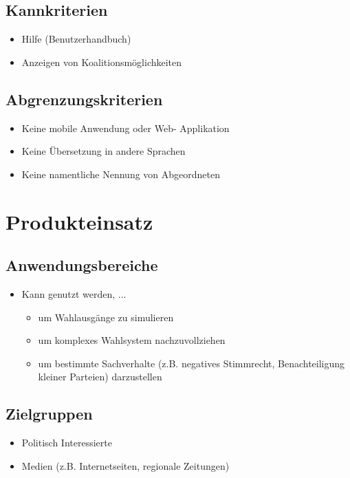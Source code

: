 \documentclass[10pt,a4paper]{article}
\begin{document}
\subsection{Kannkriterien}
\begin{itemize}
\item Hilfe (Benutzerhandbuch)
\item Anzeigen von Koalitionsmöglichkeiten
\end{itemize}


\subsection{Abgrenzungskriterien}
\begin{itemize}
\item Keine mobile Anwendung oder Web- Applikation
\item Keine Übersetzung in andere Sprachen
\item Keine namentliche Nennung von Abgeordneten
\end{itemize}


\section{Produkteinsatz}
\subsection{Anwendungsbereiche}
\begin{itemize}
\item Kann genutzt werden, ...
\begin{itemize}
\item um Wahlausgänge zu simulieren
\item um komplexes Wahlsystem nachzuvollziehen 
\item um bestimmte Sachverhalte (z.B. negatives Stimmrecht, Benachteiligung kleiner Parteien) darzustellen 
\end{itemize} 
\end{itemize}


\subsection{Zielgruppen}
\begin{itemize}
\item Politisch Interessierte
\item Medien (z.B. Internetseiten, regionale Zeitungen)
\end{itemize}
\end{document}
